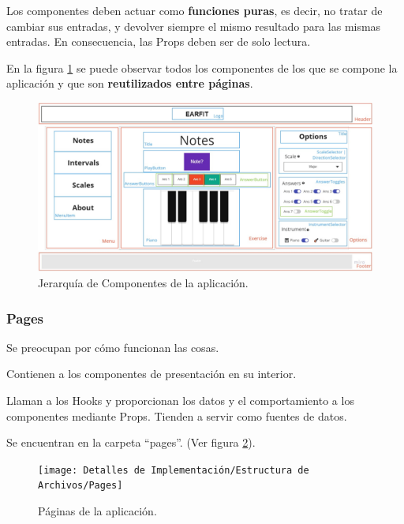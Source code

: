 \documentclass[12pt,twoside,titlepage]{report}
\begin{document}
Los componentes deben actuar como \textbf{funciones puras}, es decir, no tratar de cambiar sus entradas, y devolver siempre el mismo resultado para las mismas entradas. En consecuencia, las Props deben ser de solo lectura. 

En la figura \ref{fig:JerarquiaComponentes} se puede observar todos los componentes de los que se compone la aplicación y que son \textbf{reutilizados entre páginas}.

\begin{figure}[H]
    \centering
    \includegraphics[scale=0.28]{Detalles de Implementación/JerarquíaComponentes}
    \caption{Jerarquía de Componentes de la aplicación.}
    \label{fig:JerarquiaComponentes}
\end{figure}

\subsubsection{Pages}

\begin{compactitem}
    \item Se preocupan por cómo funcionan las cosas.
    \item Contienen a los componentes de presentación en su interior.
    \item Llaman a los Hooks y proporcionan los datos y el comportamiento a los componentes mediante Props. Tienden a servir como fuentes de datos.
    \item Se encuentran en la carpeta ``pages''. (Ver figura \ref{fig:Pages}).
\end{compactitem}

\begin{figure}[H]
    \centering
    \texttt{[image: Detalles de Implementación/Estructura de Archivos/Pages]}
    \caption{Páginas de la aplicación.}
    \label{fig:Pages}
\end{figure}
\end{document}
